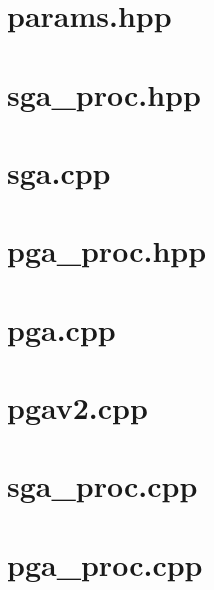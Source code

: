 \section{params.hpp}
\label{src:params.hpp}


\section{sga\_proc.hpp}
\label{src:sga_proc.hpp}


\section{sga.cpp}
\label{src:sga.cpp}


\section{pga\_proc.hpp}
\label{src:pga_proc.hpp}


\section{pga.cpp}
\label{src:pga.cpp}


\section{pgav2.cpp}
\label{src:pgav2cpp}


\section{sga\_proc.cpp}
\label{src:sga_proc.cpp}


\section{pga\_proc.cpp}
\label{src:pga_proc.cpp}


